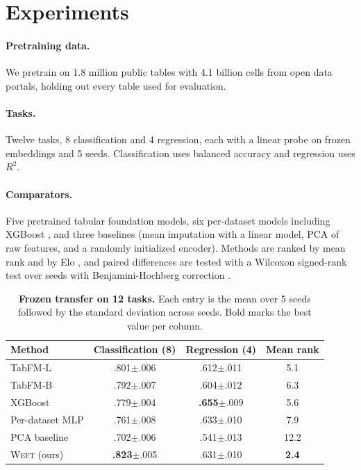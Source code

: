 \documentclass{article}
\newcommand{\weft}{\textsc{Weft}}
\begin{document}
\section{Experiments}
\paragraph{Pretraining data.} We pretrain on 1.8 million public tables with 4.1 billion cells from open data portals, holding out every table used for evaluation.
\paragraph{Tasks.} Twelve tasks, 8 classification and 4 regression, each with a linear probe on frozen embeddings and 5 seeds. Classification uses balanced accuracy and regression uses $R^2$.
\paragraph{Comparators.} Five pretrained tabular foundation models, six per-dataset models including XGBoost \citep{chen2016xgboost}, and three baselines (mean imputation with a linear model, PCA of raw features, and a randomly initialized encoder). Methods are ranked by mean rank and by Elo \citep{elo1978}, and paired differences are tested with a Wilcoxon signed-rank test over seeds with Benjamini-Hochberg correction \citep{bh1995}.

\begin{table}[t]
\caption{\textbf{Frozen transfer on 12 tasks.} Each entry is the mean over 5 seeds followed by the standard deviation across seeds. Bold marks the best value per column.}\label{tab:main}
\centering\small
\begin{tabular}{lccc}
\toprule
Method & Classification (8) & Regression (4) & Mean rank \\
\midrule
TabFM-L & .801$\pm$.006 & .612$\pm$.011 & 5.1 \\
TabFM-B & .792$\pm$.007 & .604$\pm$.012 & 6.3 \\
XGBoost & .779$\pm$.004 & \textbf{.655}$\pm$.009 & 5.6 \\
Per-dataset MLP & .761$\pm$.008 & .633$\pm$.010 & 7.9 \\
PCA baseline & .702$\pm$.006 & .541$\pm$.013 & 12.2 \\
\weft{} (ours) & \textbf{.823}$\pm$.005 & .631$\pm$.010 & \textbf{2.4} \\
\bottomrule
\end{tabular}
\end{table}
\end{document}
